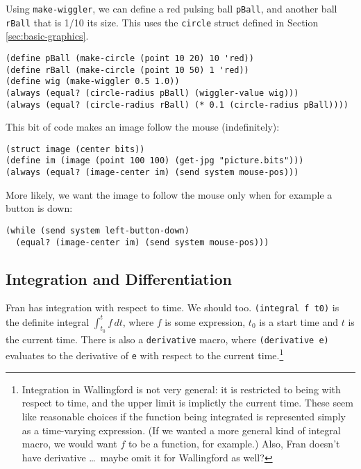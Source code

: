 \documentclass{article}
\begin{document}

Using \verb|make-wiggler|, we can define a red pulsing ball \verb|pBall|,
and another ball \verb|rBall| that is 1/10 its size.  This uses the
\verb|circle| struct defined in Section \ref{sec:basic-graphics}.

\begin{verbatim}
(define pBall (make-circle (point 10 20) 10 'red))
(define rBall (make-circle (point 10 50) 1 'red))
(define wig (make-wiggler 0.5 1.0))
(always (equal? (circle-radius pBall) (wiggler-value wig)))
(always (equal? (circle-radius rBall) (* 0.1 (circle-radius pBall))))
\end{verbatim}


This bit of code makes an image follow the mouse (indefinitely):

\begin{verbatim}
(struct image (center bits))
(define im (image (point 100 100) (get-jpg "picture.bits")))
(always (equal? (image-center im) (send system mouse-pos)))
\end{verbatim}



More likely, we want the image to follow the mouse only when for
example a button is down:

\begin{verbatim}
(while (send system left-button-down)
  (equal? (image-center im) (send system mouse-pos)))
\end{verbatim}

\subsection{Integration and Differentiation}
\label{sec:integration}

Fran has integration with respect to time.  We should too.
\verb|(integral f t0)| is the definite integral $\int_{t_0}^t f \, dt$,
where $f$ is some expression, $t_0$ is a start time and $t$ is the current
time.  There is also a \verb|derivative| macro, where \verb|(derivative e)|
evaluates to the derivative of \verb|e| with respect to the current
time.\footnote{Integration in Wallingford is not very general: it is
  restricted to being with respect to time, and the upper limit is
  implictly the current time.  These seem like reasonable choices if the
  function being integrated is represented simply as a time-varying
  expression.  (If we wanted a more general kind of integral macro, we
  would want $f$ to be a function, for example.)  Also, Fran doesn't have
  derivative \ldots\ maybe omit it for Wallingford as well?}
\end{document}
